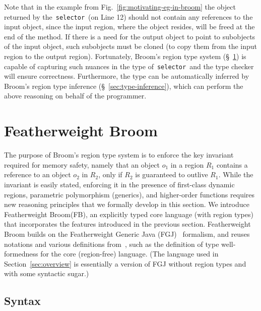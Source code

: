 \documentclass[a4paper,UKenglish]{lipics-v2018}
\newcommand{\C}[1]{\code{#1}}
\newcommand{\code}[1]{\,{\tt #1}\,}
\newcommand{\name}{{\sc Broom}\xspace}
\newcommand{\fbname}{{\sc Featherweight Broom}\xspace}
\newcommand{\FB}{{\sc FB}\xspace}
\begin{document}
 Note that in the example from
Fig.~\ref{fig:motivating-eg-in-broom} the object returned by the
\C{selector} (on Line 12) should not contain any references to the
input object, since the input region, where the object resides, will
be freed at the end of the method. If there is a need for the output
object to point to subobjects of the input object, such subobjects
must be cloned (to copy them from the input region to the output
region).  Fortunately, \name's region type system
(\S~\ref{sec:type-system}) is capable of capturing such nuances in the
type of \C{selector} and the type checker will ensure correctness.
Furthermore, the type can be automatically inferred by \name's region
type inference (\S~\ref{sec:type-inference}), which can perform the
above reasoning on behalf of the programmer.

\section{\fbname}
\label{sec:type-system}

The purpose of \name's region type system is to enforce the key
invariant required for memory safety, namely that an object $o_1$ in a
region $R_1$ contains a reference to an object $o_2$ in $R_2$, only if
$R_2$ is guaranteed to outlive $R_1$.  While the invariant is easily
stated, enforcing it in the presence of first-class dynamic regions,
parametric polymorphism (generics), and higher-order functions
requires new reasoning principles that we formally develop in this
section. We introduce \fbname (\FB), an explicitly typed core language
(with region types) that incorporates the features introduced in the
previous section. \fbname builds on the Featherweight Generic Java
(FGJ)~\cite{fgj} formalism, and reuses notations and various
definitions from~\cite{fgj}, such as the definition of type
well-formedness for the core (region-free) language.  (The language
used in Section~\ref{sec:overview} is essentially a version of FGJ
without region types and with some syntactic sugar.)

\subsection{Syntax}
\label{sec:fb-syntax}
\end{document}
